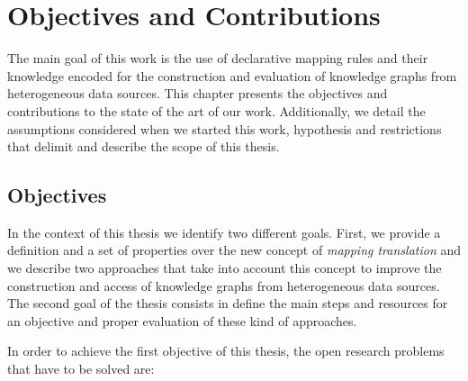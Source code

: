 
\chapter{Objectives and Contributions}
\label{chap:objectives}
The main goal of this work is the use of declarative mapping rules and their knowledge encoded for the construction and evaluation of knowledge graphs from heterogeneous data sources. This chapter presents the objectives and contributions to the state of the art of our work. Additionally, we detail the assumptions considered when we started this work, hypothesis and restrictions that delimit and describe the scope of this thesis.

\section{Objectives}
In the context of this thesis we identify two different goals. First, we provide a definition and a set of properties over the new concept of \textit{mapping translation} and we describe two approaches that take into account this concept to improve the construction and access of knowledge graphs from heterogeneous data sources. The second goal of the thesis consists in define the main steps and resources for an objective and proper evaluation of these kind of approaches.

In order to achieve the first objective of this thesis, the open research problems that have to be solved are:


